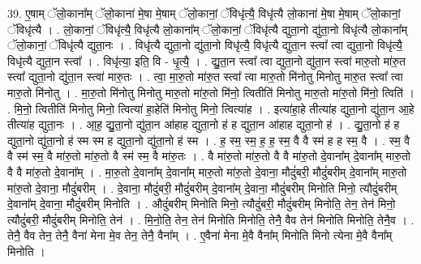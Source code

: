 \documentclass[17pt]{extarticle}
\begin{document}
39. ए॒षाम् ॅलो॒काना᳚म् ॅलो॒काना॑ मे॒षा मे॒षाम् ॅलो॒कानां॒ ॅविधृ॑त्यै॒ विधृ॑त्यै लो॒काना॑ मे॒षा मे॒षाम् ॅलो॒कानां॒ ॅविधृ॑त्यै । . लो॒कानां॒ ॅविधृ॑त्यै॒ विधृ॑त्यै लो॒काना᳚म् ॅलो॒कानां॒ ॅविधृ॑त्यै द्युता॒नो द्यु॑ता॒नो विधृ॑त्यै लो॒काना᳚म् ॅलो॒कानां॒ ॅविधृ॑त्यै द्युता॒नः । . विधृ॑त्यै द्युता॒नो द्यु॑ता॒नो विधृ॑त्यै॒ विधृ॑त्यै द्युता॒न स्त्वा᳚ त्वा द्युता॒नो विधृ॑त्यै॒ विधृ॑त्यै द्युता॒न स्त्वा᳚ । . विधृ॑त्या॒ इति॒ वि - धृ॒त्यै॒ । . द्यु॒ता॒न स्त्वा᳚ त्वा द्युता॒नो द्यु॑ता॒न स्त्वा॑ मारु॒तो मा॑रु॒त स्त्वा᳚ द्युता॒नो द्यु॑ता॒न स्त्वा॑ मारु॒तः । . त्वा॒ मा॒रु॒तो मा॑रु॒त स्त्वा᳚ त्वा मारु॒तो मि॑नोतु मिनोतु मारु॒त स्त्वा᳚ त्वा मारु॒तो मि॑नोतु । . मा॒रु॒तो मि॑नोतु मिनोतु मारु॒तो मा॑रु॒तो मि॑नो॒ त्वितीति॑ मिनोतु मारु॒तो मा॑रु॒तो मि॑नो॒ त्विति॑ । . मि॒नो॒ त्वितीति॑ मिनोतु मिनो॒ त्वित्या॑ हा॒हेति॑ मिनोतु मिनो॒ त्वित्या॑ह । . इत्या॑हा॒हे तीत्या॑ह द्युता॒नो द्यु॑ता॒न आ॒हे तीत्या॑ह द्युता॒नः । . आ॒ह॒ द्यु॒ता॒नो द्यु॑ता॒न आ॑हाह द्युता॒नो ह॑ ह द्युता॒न आ॑हाह द्युता॒नो ह॑ । . द्यु॒ता॒नो ह॑ ह द्युता॒नो द्यु॑ता॒नो ह॑ स्म स्म ह द्युता॒नो द्यु॑ता॒नो ह॑ स्म । . ह॒ स्म॒ स्म॒ ह॒ ह॒ स्म॒ वै वै स्म॑ ह ह स्म॒ वै । . स्म॒ वै वै स्म॑ स्म॒ वै मा॑रु॒तो मा॑रु॒तो वै स्म॑ स्म॒ वै मा॑रु॒तः । . वै मा॑रु॒तो मा॑रु॒तो वै वै मा॑रु॒तो दे॒वाना᳚म् दे॒वाना᳚म् मारु॒तो वै वै मा॑रु॒तो दे॒वाना᳚म् । . मा॒रु॒तो दे॒वाना᳚म् दे॒वाना᳚म् मारु॒तो मा॑रु॒तो दे॒वाना॒ मौदुं॑बरी॒ मौदुं॑बरीम् दे॒वाना᳚म् मारु॒तो मा॑रु॒तो दे॒वाना॒ मौदुं॑बरीम् । . दे॒वाना॒ मौदुं॑बरी॒ मौदुं॑बरीम् दे॒वाना᳚म् दे॒वाना॒ मौदुं॑बरीम् मिनोति मिनो॒ त्यौदुं॑बरीम् दे॒वाना᳚म् दे॒वाना॒ मौदुं॑बरीम् मिनोति । . औदुं॑बरीम् मिनोति मिनो॒ त्यौदुं॑बरी॒ मौदुं॑बरीम् मिनोति॒ तेन॒ तेन॑ मिनो॒ त्यौदुं॑बरी॒ मौदुं॑बरीम् मिनोति॒ तेन॑ । . मि॒नो॒ति॒ तेन॒ तेन॑ मिनोति मिनोति॒ तेनै॒ वैव तेन॑ मिनोति मिनोति॒ तेनै॒व । . तेनै॒ वैव तेन॒ तेनै॒ वैना॑ मेना मे॒व तेन॒ तेनै॒ वैना᳚म् । . ए॒वैना॑ मेना मे॒वै वैना᳚म् मिनोति मिनो त्येना मे॒वै वैना᳚म् मिनोति । \newline
\pagebreak
{}
\end{document}
